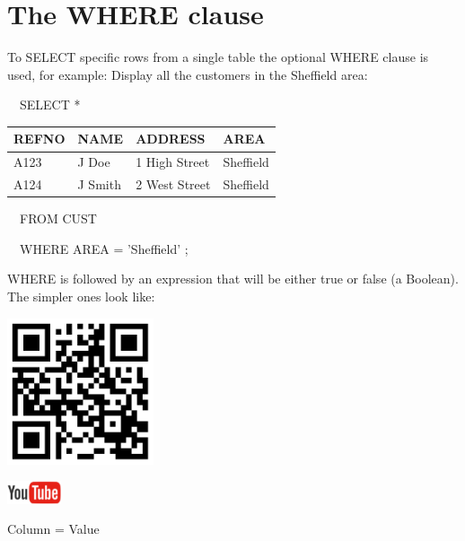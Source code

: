 \section{The WHERE clause}
To SELECT specific rows from a single table the optional WHERE clause is used, for example:  Display all the customers in the Sheffield area:

\ \ SELECT *

\begin{center}
\begin{minipage}{9.192cm}
\begin{flushleft}
\tablefirsthead{}
\tablehead{}
\tabletail{}
\tablelasttail{}
\begin{supertabular}{|m{1.742cm}|m{1.798cm}|m{2.8cm}|m{2.049cm}|}
\hline
REFNO &
NAME &
ADDRESS &
AREA\\\hline
A123 &
J Doe &
1 High Street &
Sheffield\\
A124 &
J Smith &
2 West Street &
Sheffield\\
\end{supertabular}
\end{flushleft}
\end{minipage}
\end{center}
\ \ FROM CUST 

\ \ WHERE AREA = 'Sheffield' ;

WHERE is followed by an expression that will be either true or false (a Boolean). The simpler ones look like:

\begin{center}
\begin{minipage}{4.849cm}
   
\includegraphics[width=4.314cm,height=4.314cm]{images/img (24).png}
 

   
\includegraphics[width=1.582cm,height=0.674cm]{images/img (15).png}
 
\end{minipage}
\end{center}
Column  = Value

